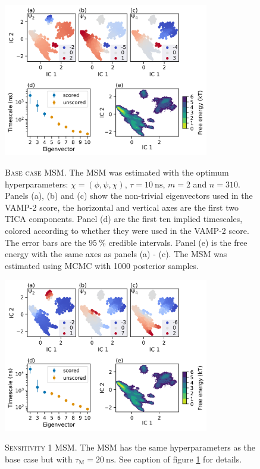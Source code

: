 \begin{figure}
    \centering
    \caption[Base case MSM]{\textsc{Base case MSM}. The MSM was estimated with the optimum hyperparameters: $\chi= (\phi, \psi, \chi)$, $\tau=\SI{10}{\nano\second}$, $m=2$ and $n=310$. Panels (a), (b) and (c) show the non-trivial eigenvectors used in the VAMP-2 score, the horizontal and vertical axes are the first two TICA components. Panel (d) are the first ten implied timescales, colored according to whether they were used in the VAMP-2 score. The error bars are the $\SI{95}{\percent}$ credible intervals.  Panel (e) is the free energy with the same axes as panels (a) - (c). The MSM was estimated using MCMC with \num{1000} posterior samples.}
    \includegraphics[width=0.8\textwidth]{chapters/msm_optimization/figures/aadh_msm_best.png}
    \label{fig:aadh_msm_best}
\end{figure}

\begin{figure}
    \centering
    \caption[Sensitivity 1 MSM]{\textsc{Sensitivity 1 MSM}. The MSM has the same hyperparameters as the base case but with $\tau_{\mathrm{M}}=\SI{20}{\nano\second}$. See caption of figure \ref{fig:aadh_msm_best} for details.}
    \includegraphics[width=0.8\textwidth]{chapters/msm_optimization/figures/aadh_msm_sens_1.png}
    \label{fig:aadh_msm_sens_1}
\end{figure}

